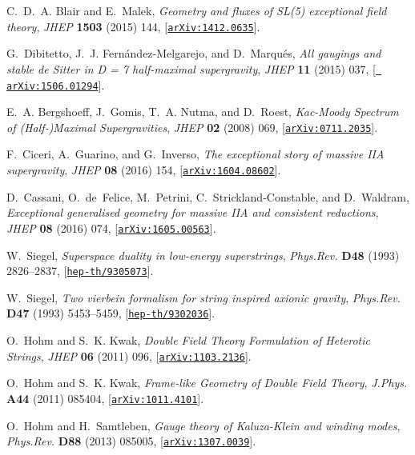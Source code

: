 \documentclass{PoS}
\begin{document}
\begin{thebibliography}{99}
C.~D.~A. Blair and E.~Malek, {\it {Geometry and fluxes of SL(5) exceptional
  field theory}},  {\em JHEP} {\bf 1503} (2015) 144,
  [\href{http://arxiv.org/abs/1412.0635}{{\tt arXiv:1412.0635}}].

G.~Dibitetto, J.~J. Fern\'{a}ndez-Melgarejo, and D.~Marqu{\'e}s, {\it {All
  gaugings and stable de Sitter in D = 7 half-maximal supergravity}},  {\em
  JHEP} {\bf 11} (2015) 037, [\href{http://arxiv.org/abs/1506.01294}{{\tt
  arXiv:1506.01294}}].

E.~A. Bergshoeff, J.~Gomis, T.~A. Nutma, and D.~Roest, {\it {Kac-Moody Spectrum
  of (Half-)Maximal Supergravities}},  {\em JHEP} {\bf 02} (2008) 069,
  [\href{http://arxiv.org/abs/0711.2035}{{\tt arXiv:0711.2035}}].

F.~Ciceri, A.~Guarino, and G.~Inverso, {\it {The exceptional story of massive
  IIA supergravity}},  {\em JHEP} {\bf 08} (2016) 154,
  [\href{http://arxiv.org/abs/1604.08602}{{\tt arXiv:1604.08602}}].

D.~Cassani, O.~de~Felice, M.~Petrini, C.~Strickland-Constable, and D.~Waldram,
  {\it {Exceptional generalised geometry for massive IIA and consistent
  reductions}},  {\em JHEP} {\bf 08} (2016) 074,
  [\href{http://arxiv.org/abs/1605.00563}{{\tt arXiv:1605.00563}}].

W.~Siegel, {\it {Superspace duality in low-energy superstrings}},  {\em
  Phys.Rev.} {\bf D48} (1993) 2826--2837,
  [\href{http://arxiv.org/abs/hep-th/9305073}{{\tt hep-th/9305073}}].

W.~Siegel, {\it {Two vierbein formalism for string inspired axionic gravity}},
  {\em Phys.Rev.} {\bf D47} (1993) 5453--5459,
  [\href{http://arxiv.org/abs/hep-th/9302036}{{\tt hep-th/9302036}}].

O.~Hohm and S.~K. Kwak, {\it {Double Field Theory Formulation of Heterotic
  Strings}},  {\em JHEP} {\bf 06} (2011) 096,
  [\href{http://arxiv.org/abs/1103.2136}{{\tt arXiv:1103.2136}}].

O.~Hohm and S.~K. Kwak, {\it {Frame-like Geometry of Double Field Theory}},
  {\em J.Phys.} {\bf A44} (2011) 085404,
  [\href{http://arxiv.org/abs/1011.4101}{{\tt arXiv:1011.4101}}].

O.~Hohm and H.~Samtleben, {\it {Gauge theory of Kaluza-Klein and winding
  modes}},  {\em Phys.Rev.} {\bf D88} (2013) 085005,
  [\href{http://arxiv.org/abs/1307.0039}{{\tt arXiv:1307.0039}}].


\end{thebibliography}
\end{document}
